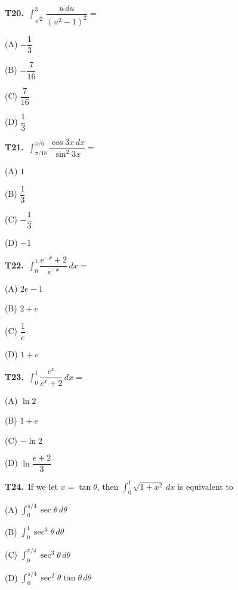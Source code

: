 \documentclass[11pt]{article}
\begin{document}
\bigskip\noindent\textbf{T20.}\ $\displaystyle\int_{\sqrt{2}}^{3} \dfrac{u\,du}{(u^2-1)^2} =$
\begin{list}{}{\setlength{\leftmargin}{3em}\setlength{\labelwidth}{2.5em}\setlength{\itemsep}{0pt}\setlength{\topsep}{2pt}}
\item[(A)] $-\dfrac{1}{3}$
\item[(B)] $-\dfrac{7}{16}$
\item[(C)] $\dfrac{7}{16}$
\item[(D)] $\dfrac{1}{3}$
\end{list}

\bigskip\noindent\textbf{T21.}\ $\displaystyle\int_{\pi/18}^{\pi/6} \dfrac{\cos 3x\,dx}{\sin^2 3x} =$
\begin{list}{}{\setlength{\leftmargin}{3em}\setlength{\labelwidth}{2.5em}\setlength{\itemsep}{0pt}\setlength{\topsep}{2pt}}
\item[(A)] $1$
\item[(B)] $\dfrac{1}{3}$
\item[(C)] $-\dfrac{1}{3}$
\item[(D)] $-1$
\end{list}

\bigskip\noindent\textbf{T22.}\ $\displaystyle\int_{0}^{1} \dfrac{e^{-x}+2}{e^{-x}}\,dx =$
\begin{list}{}{\setlength{\leftmargin}{3em}\setlength{\labelwidth}{2.5em}\setlength{\itemsep}{0pt}\setlength{\topsep}{2pt}}
\item[(A)] $2e-1$
\item[(B)] $2+e$
\item[(C)] $\dfrac{1}{e}$
\item[(D)] $1+e$
\end{list}

\bigskip\noindent\textbf{T23.}\ $\displaystyle\int_{0}^{1} \dfrac{e^x}{e^x+2}\,dx =$
\begin{list}{}{\setlength{\leftmargin}{3em}\setlength{\labelwidth}{2.5em}\setlength{\itemsep}{0pt}\setlength{\topsep}{2pt}}
\item[(A)] $\ln 2$
\item[(B)] $1+e$
\item[(C)] $-\ln 2$
\item[(D)] $\ln\dfrac{e+2}{3}$
\end{list}

\bigskip\noindent\textbf{T24.}\ If we let $x=\tan\theta$, then $\displaystyle\int_{0}^{1} \sqrt{1+x^2}\,dx$ is equivalent to
\begin{list}{}{\setlength{\leftmargin}{3em}\setlength{\labelwidth}{2.5em}\setlength{\itemsep}{0pt}\setlength{\topsep}{2pt}}
\item[(A)] $\displaystyle\int_{0}^{\pi/4} \sec\theta\,d\theta$
\item[(B)] $\displaystyle\int_{0}^{1} \sec^3\theta\,d\theta$
\item[(C)] $\displaystyle\int_{0}^{\pi/4} \sec^3\theta\,d\theta$
\item[(D)] $\displaystyle\int_{0}^{\pi/4} \sec^2\theta\tan\theta\,d\theta$
\end{list}
\end{document}
